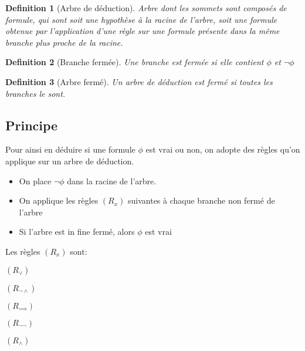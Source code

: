 \documentclass{paper}
\newtheorem{defi}{Definition}
\begin{document}
\begin{defi}[Arbre de déduction]
    Arbre dont les sommets sont composés de formule, qui sont soit une hypothèse à la racine de l'arbre, soit une formule obtenue par l'application d'une règle sur une formule présente dans la même branche plus proche de la racine.
\end{defi}

\begin{defi}[Branche fermée]
    Une branche est fermée si elle contient $\phi$ et $\lnot\phi$
\end{defi}

\begin{defi}[Arbre fermé]
    Un arbre de déduction est fermé si toutes les branches le sont.
\end{defi}

\subsection{Principe}
Pour ainsi en déduire si une formule $\phi$ est vrai ou non, on adopte des règles qu'on applique sur un arbre de déduction.
\begin{itemize}
    \item On place $\lnot\phi$ dans la racine de l'arbre.
    \item On applique les règles $(R_x)$ suivantes à chaque branche non fermé de l'arbre
    \item Si l'arbre est in fine fermé, alors $\phi$ est vrai
\end{itemize}

Les règles $(R_x)$ sont:

$(R_\lor)$
$(R_{\lnot\land})$
$(R_{\implies})$
$(R_{\lnot\lnot})$
$(R_{\land})$
\end{document}
